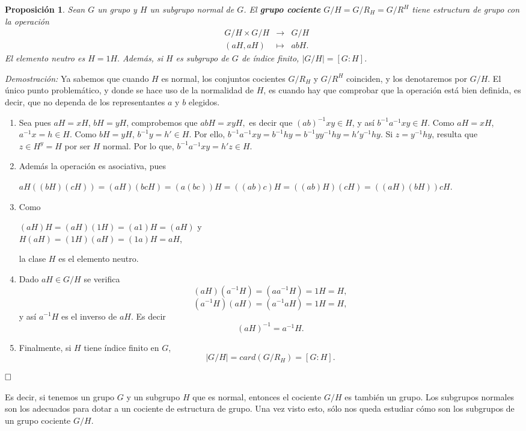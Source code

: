 \documentclass[12pt]{article}
\newtheorem{proposition}[theorem]{Proposición}
\begin{document}
\begin{proposition}\label{eq:cociente} Sean $G$ un grupo y $H$ un subgrupo normal de $G$. El \textbf{grupo cociente} $G/H = G/R_{H} = G/R^{H}$ tiene estructura de grupo con la operación $$\begin{array}{rccl}
&G/H \times G/H & \longrightarrow & G/H\\
&(aH,aH) & \longmapsto &abH.
\end{array}
$$
El elemento neutro es $H=1H.$ Además, si $H$ es subgrupo de $G$ de índice finito, $|G/H| = \left[ G:H \right]$.
\end{proposition}
\emph{Demostración: }Ya sabemos que cuando $H$ es normal, los conjuntos cocientes $G/R_{H}$ y $G/R^{H}$ coinciden, y los denotaremos por $G/H$. El único punto problemático, y donde se hace uso de la normalidad de $H$, es cuando hay que comprobar que la operación está bien definida, es decir, que no dependa de los representantes $a$ y $b$ elegidos.
\begin{enumerate}
\item Sea pues $aH = xH$, $bH = yH$, comprobemos que $abH =xyH,$ es decir que $(ab)^{-1}xy \in H$, y así $b^{-1}a^{-1}xy \in H.$
Como $aH = xH$, $a^{-1}x = h \in H$. Como $bH = yH$, $b^{-1}y = h' \in H$. Por ello, $b^{-1}a^{-1}xy = b^{-1}hy = b^{-1}yy^{-1}hy = h'y^{-1}hy.$
Si $z = y^{-1}hy$, resulta que  $z \in H^{y} = H$ por ser $H$ normal. Por lo que, $b^{-1}a^{-1}xy = h'z \in H.$
\item Además la operación es asociativa, pues \begin{center}$aH((bH)(cH)) = (aH)(bcH) = (a(bc))H = ((ab)c)H = ((ab)H)(cH) = ((aH)(bH))cH.$\end{center}
\item Como
\begin{center}
$(aH)H=(aH)(1H)=(a1)H=(aH)$ y\\
$H(aH)=(1H)(aH)=(1a)H=aH$,
\end{center}
la clase $H$ es el elemento neutro. 
\item Dado $aH \in G/H$ se verifica $$(aH)(a^{-1}H) = (aa^{-1}H) = 1H = H,$$ $$(a^{-1}H)(aH) = (a^{-1}aH) = 1H = H,$$ y así $a^{-1}H$ es el inverso de $aH$. Es decir $$(aH)^{-1} = a^{-1}H.$$
\item Finalmente, si $H$ tiene índice finito en $G$, $$|G/H| = card(G/R_{H}) = \left[ G:H \right].$$
\end{enumerate}

$\hfill \square$

Es decir, si tenemos un grupo $G$ y un subgrupo $H$ que es normal, entonces el cociente $G/H$ es también un grupo. Los subgrupos normales son los adecuados para dotar a un cociente de estructura de grupo. Una vez visto esto, sólo nos queda estudiar cómo son los subgrupos de un grupo cociente $G/H$.
\end{document}
